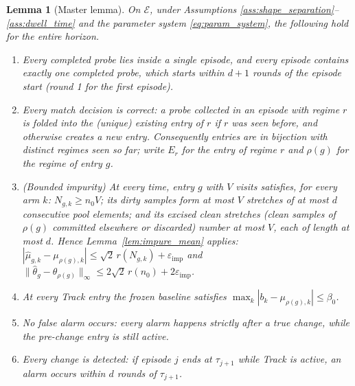 \documentclass[11pt]{article}
\newtheorem{lemma}{Lemma}
\newcommand{\Ecal}{\mathcal E}
\newcommand{\eimp}{\varepsilon_{\mathrm{imp}}}
\begin{document}
\begin{lemma}[Master lemma]
\label{lem:master}
On $\Ecal$, under Assumptions \ref{ass:shape_separation}--\ref{ass:dwell_time} and the parameter system \eqref{eq:param_system}, the following hold for the entire horizon.
\begin{enumerate}[leftmargin=1.8em,label=(M\arabic*)]
\item\label{M1} Every completed probe lies inside a single episode, and every episode contains exactly one completed probe, which starts within $d+1$ rounds of the episode start (round 1 for the first episode).
\item\label{M2} Every match decision is correct: a probe collected in an episode with regime $r$ is folded into the (unique) existing entry of $r$ if $r$ was seen before, and otherwise creates a new entry. Consequently entries are in bijection with distinct regimes seen so far; write $E_r$ for the entry of regime $r$ and $\rho(g)$ for the regime of entry $g$.
\item\label{M3} (\emph{Bounded impurity}) At every time, entry $g$ with $V$ visits satisfies, for every arm $k$: $N_{g,k}\ge n_0V$; its dirty samples form at most $V$ stretches of at most $d$ consecutive pool elements; and its excised clean stretches (clean samples of $\rho(g)$ committed elsewhere or discarded) number at most $V$, each of length at most $d$. Hence Lemma~\ref{lem:impure_mean} applies:
$|\widehat\mu_{g,k}-\mu_{\rho(g),k}|\le\sqrt2\,r(N_{g,k})+\eimp$ and
$\|\widehat\theta_g-\theta_{\rho(g)}\|_\infty\le2\sqrt2\,r(n_0)+2\eimp$.
\item\label{M4} At every Track entry the frozen baseline satisfies $\max_k|b_k-\mu_{\rho(g),k}|\le\beta_0$.
\item\label{M5} No false alarm occurs: every alarm happens strictly after a true change, while the pre-change entry is still active.
\item\label{M6} Every change is detected: if episode $j$ ends at $\tau_{j+1}$ while Track is active, an alarm occurs within $d$ rounds of $\tau_{j+1}$.
\end{enumerate}
\end{lemma}
\end{document}
